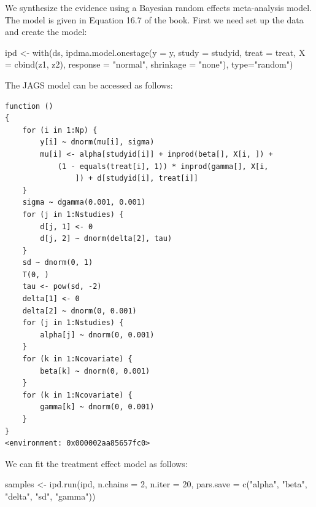 \documentclass[
  letterpaper,
  DIV=11,
  numbers=noendperiod]{scrreprt}
\newenvironment{Shaded}{\begin{snugshade}}{\end{snugshade}}
\newcommand{\AttributeTok}[1]{\textcolor[rgb]{0.40,0.45,0.13}{#1}}
\newcommand{\DecValTok}[1]{\textcolor[rgb]{0.68,0.00,0.00}{#1}}
\newcommand{\FunctionTok}[1]{\textcolor[rgb]{0.28,0.35,0.67}{#1}}
\newcommand{\NormalTok}[1]{\textcolor[rgb]{0.00,0.23,0.31}{#1}}
\newcommand{\OtherTok}[1]{\textcolor[rgb]{0.00,0.23,0.31}{#1}}
\newcommand{\SpecialCharTok}[1]{\textcolor[rgb]{0.37,0.37,0.37}{#1}}
\newcommand{\StringTok}[1]{\textcolor[rgb]{0.13,0.47,0.30}{#1}}
\begin{document}
We synthesize the evidence using a Bayesian random effects meta-analysis
model. The model is given in Equation 16.7 of the book. First we need
set up the data and create the model:

\begin{Shaded}
\begin{Highlighting}[]
\NormalTok{ipd }\OtherTok{\textless{}{-}} \FunctionTok{with}\NormalTok{(ds, }\FunctionTok{ipdma.model.onestage}\NormalTok{(}\AttributeTok{y =}\NormalTok{ y, }\AttributeTok{study =}\NormalTok{ studyid, }\AttributeTok{treat =}\NormalTok{ treat,}
                                     \AttributeTok{X =} \FunctionTok{cbind}\NormalTok{(z1, z2), }
                                     \AttributeTok{response =} \StringTok{"normal"}\NormalTok{, }
                                     \AttributeTok{shrinkage =} \StringTok{"none"}\NormalTok{), }
                                     \AttributeTok{type=}\StringTok{"random"}\NormalTok{)}
\end{Highlighting}
\end{Shaded}

The JAGS model can be accessed as follows:

\begin{Shaded}
\end{Shaded}

\begin{verbatim}
function () 
{
    for (i in 1:Np) {
        y[i] ~ dnorm(mu[i], sigma)
        mu[i] <- alpha[studyid[i]] + inprod(beta[], X[i, ]) + 
            (1 - equals(treat[i], 1)) * inprod(gamma[], X[i, 
                ]) + d[studyid[i], treat[i]]
    }
    sigma ~ dgamma(0.001, 0.001)
    for (j in 1:Nstudies) {
        d[j, 1] <- 0
        d[j, 2] ~ dnorm(delta[2], tau)
    }
    sd ~ dnorm(0, 1)
    T(0, )
    tau <- pow(sd, -2)
    delta[1] <- 0
    delta[2] ~ dnorm(0, 0.001)
    for (j in 1:Nstudies) {
        alpha[j] ~ dnorm(0, 0.001)
    }
    for (k in 1:Ncovariate) {
        beta[k] ~ dnorm(0, 0.001)
    }
    for (k in 1:Ncovariate) {
        gamma[k] ~ dnorm(0, 0.001)
    }
}
<environment: 0x000002aa85657fc0>
\end{verbatim}

We can fit the treatment effect model as follows:

\begin{Shaded}
\begin{Highlighting}[]
\NormalTok{samples }\OtherTok{\textless{}{-}} \FunctionTok{ipd.run}\NormalTok{(ipd, }\AttributeTok{n.chains =} \DecValTok{2}\NormalTok{, }\AttributeTok{n.iter =} \DecValTok{20}\NormalTok{,}
                   \AttributeTok{pars.save =} \FunctionTok{c}\NormalTok{(}\StringTok{"alpha"}\NormalTok{, }\StringTok{"beta"}\NormalTok{, }\StringTok{"delta"}\NormalTok{, }\StringTok{"sd"}\NormalTok{, }\StringTok{"gamma"}\NormalTok{))}
\end{Highlighting}
\end{Shaded}
\end{document}
